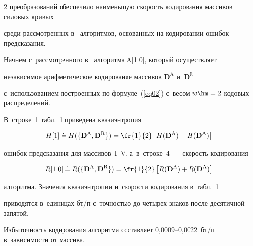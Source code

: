 \begin{multicols}{2}
преобразований обеспечило наименьшую скорость кодирования массивов силовых кривых 

среди рассмотренных в~\cite{b1} алгоритмов, основанных на кодировании ошибок предсказания.



Начнем с~рассмотренного в~\cite{b1} алгоритма A[1$\vert$0], который осуществляет 

независимое арифметическое кодирование массивов $\mathbf{D}^\text{A}$ и~$\mathbf{D}^\text{R}$ 

с~использованием построенных по формуле~(\ref{eq02}) с~весом $w\hm=2$ кодовых распределений. 

В~строке~1 табл.~\ref{tab1} приведена квазиэнтропия

$$

H[1]\doteq H(\{\mathbf{D}^\text{A}, \mathbf{D}^\text{R} \}) = 

\fr{1}{2}\left[H(\mathbf{D}^\text{A}) + H(\mathbf{D}^\text{A})\right]

$$

ошибок предсказания для массивов~I--V, а~в~строке~4~--- ско\-рость кодирования

$$

R[1\vert 0]\doteq R(\{\mathbf{D}^\text{A}, \mathbf{D}^\text{R} \}) = 

\fr{1}{2}\left[R(\mathbf{D}^\text{A}) + R(\mathbf{D}^\text{A})\right]

$$

алгоритма. Значения квазиэнтропии и~скорости кодирования в~табл.~1 

приводятся в~единицах бт/п с~точностью до четырех знаков после десятичной запятой. 

Избыточность кодирования алгоритма составляет 0,0009--0,0022~бт/п в~зависимости от массива.





\begin{table}\small %

\begin{center}


\label{tab1}

\vspace{2ex}



\begin{tabular}{|c|l|c|c|c|c|c|}

\hline


\end{tabular}
\end{center}
\end{table}
\end{multicols}
